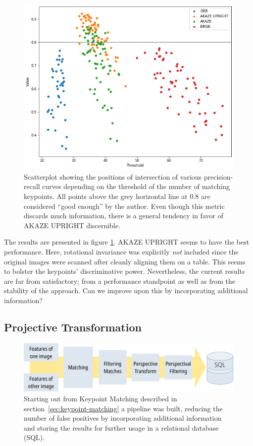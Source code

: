 \documentclass{ltjarticle}
\begin{document}
\begin{figure}
    \centering
    \includegraphics[width=\textwidth]{keypoint-evaluation.png}
    \caption{Scatterplot showing the positions of intersection of various precision-recall curves depending on the threshold of the number of matching keypoints. All points above the grey horizontal line at $0.8$ are considered “good enough” by the author. Even though this metric discards much information, there is a general tendency in favor of AKAZE UPRIGHT discernible.}
    \label{fig:keypoint-evaluation}
\end{figure}

The results are presented in figure \ref{fig:keypoint-evaluation}. AKAZE UPRIGHT seems to have the best performance. Here, rotational invariance was explicitly \emph{not} included since the original images were scanned after cleanly aligning them on a table. This seems to bolster the keypoints' discriminative power. Nevertheless, the current results are far from satisfactory; from a performance standpoint as well as from the stability of the approach. Can we improve upon this by incorporating additional information?

\subsection{Projective Transformation}

\begin{figure}
    \centering
    \includegraphics[width=\textwidth]{pipeline.pdf}
    \caption{Starting out from Keypoint Matching described in section~\ref{sec:keypoint-matching} a pipeline was built, reducing the number of false positives by incorporating additional information and storing the results for further usage in a relational database (SQL).}
    \label{fig:pipeline}
\end{figure}
\end{document}
